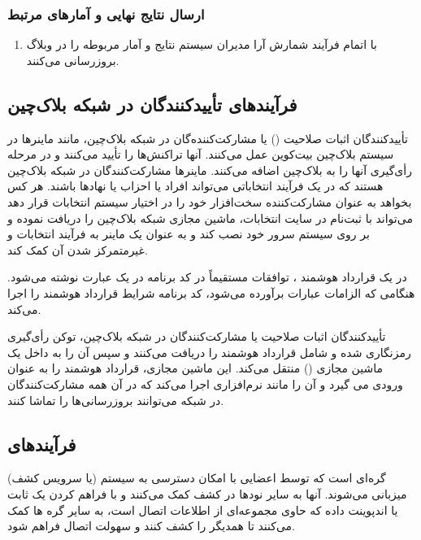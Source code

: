 \documentclass[12pt]{article}
\begin{document}
\subsubsection{ارسال نتایج نهایی و آمارهای مرتبط}
\begin{enumerate}[label=(\arabic*)]
\item
با اتمام فرآیند شمارش آرا مدیران سیستم نتایج و آمار مربوطه را در وبلاگ بروزرسانی می‌کنند. 
\end{enumerate}



\subsection{فرآیندهای تأییدکنند‌گان  در شبکه بلاک‌چین}
تأییدکنند‌گان  اثبات صلاحیت%
()
یا مشارکت‌کننده‌گان در شبکه بلاک‌چین، مانند ماینرها در سیستم بلاک‌چین بیت‌کوین عمل می‌کنند. آنها تراکنش‌ها را تأیید می‌کنند و در مرحله رأی‌گیری آنها را به بلاک‌چین اضافه می‌کنند. ماینرها مشارکت‌کنند‌گان در شبکه بلاک‌چین هستند که در یک فرآیند انتخاباتی می‌تواند افراد یا احزاب یا نهادها باشند. هر کس بخواهد به عنوان مشارکت‌کننده سخت‌افزار خود را در اختیار سیستم انتخابات قرار دهد می‌تواند با ثبت‌نام در سایت انتخابات، ماشین مجازی شبکه بلاک‌چین را دریافت نموده و بر روی سیستم سرور خود نصب کند و به عنوان یک ماینر به فرآیند انتخابات و غیرمتمرکز شدن آن کمک کند. 

در یک قرارداد هوشمند%
، 
توافقات مستقیماً در کد برنامه در یک عبارت 
نوشته می‌شود. هنگامی که الزامات عبارات 
برآورده می‌شود، کد برنامه شرایط قرارداد هوشمند را اجرا می‌کند.

تأییدکنند‌گان اثبات صلاحیت یا مشارکت‌کنندگان در شبکه بلاک‌چین،  توکن رأی‌گیری رمزنگاری شده و شامل قرارداد هوشمند را دریافت می‌کنند و سپس آن را به داخل یک ماشین مجازی 
() 
منتقل می‌کند. این ماشین مجازی، قرارداد هوشمند را به عنوان ورودی می گیرد و آن را مانند نرم‌افزاری اجرا می‌کند که در آن همه مشارکت‌کنندگان در شبکه می‌توانند بروزرسانی‌ها را تماشا کنند. 




\subsection{فرآیندهای }
(یا سرویس کشف) گره‌ای است که توسط اعضایی با امکان دسترسی  به سیستم میزبانی می‌شوند. آنها به سایر نودها در کشف کمک می‌کنند و با فراهم کردن یک 
ثابت یا اندپوینت
داده که حاوی مجموعه‌ای از اطلاعات اتصال است، به سایر گره ها کمک می‌کنند تا همدیگر را کشف کنند و سهولت اتصال فراهم شود.
\end{document}
